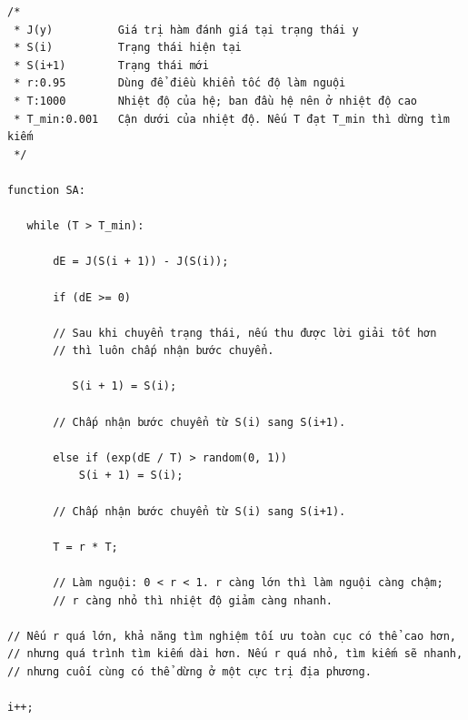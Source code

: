 \documentclass[11pt]{article}
\begin{document}
\begingroup
\footnotesize
\begin{verbatim}
/*
 * J(y)          Giá trị hàm đánh giá tại trạng thái y
 * S(i)          Trạng thái hiện tại
 * S(i+1)        Trạng thái mới
 * r:0.95        Dùng để điều khiển tốc độ làm nguội
 * T:1000        Nhiệt độ của hệ; ban đầu hệ nên ở nhiệt độ cao
 * T_min:0.001   Cận dưới của nhiệt độ. Nếu T đạt T_min thì dừng tìm kiếm
 */

function SA:

   while (T > T_min):

       dE = J(S(i + 1)) - J(S(i));

       if (dE >= 0)

       // Sau khi chuyển trạng thái, nếu thu được lời giải tốt hơn
       // thì luôn chấp nhận bước chuyển.

          S(i + 1) = S(i);

       // Chấp nhận bước chuyển từ S(i) sang S(i+1).

       else if (exp(dE / T) > random(0, 1))
           S(i + 1) = S(i);

       // Chấp nhận bước chuyển từ S(i) sang S(i+1).

       T = r * T;

       // Làm nguội: 0 < r < 1. r càng lớn thì làm nguội càng chậm;
       // r càng nhỏ thì nhiệt độ giảm càng nhanh.

// Nếu r quá lớn, khả năng tìm nghiệm tối ưu toàn cục có thể cao hơn,
// nhưng quá trình tìm kiếm dài hơn. Nếu r quá nhỏ, tìm kiếm sẽ nhanh,
// nhưng cuối cùng có thể dừng ở một cực trị địa phương.

i++;
\end{verbatim}
\endgroup
\end{document}
